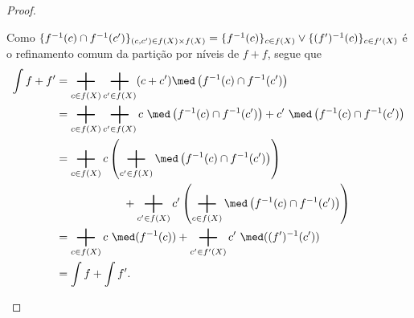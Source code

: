 \begin{proof}
\begin{enumerate}
\begin{equation*}
	\end{equation*}
Como $\{f^{-1}(c) \cap f^{-1}(c')\}_{(c,c') \in f(X) \times f(X)} = \{f^{-1}(c)\}_{c \in f(X)} \vee \{(f')^{-1}(c)\}_{c \in f'(X)}$ é o refinamento comum da partição por níveis de $f + f$, segue que
	\begin{align*}
	\int f+f' &= \sum_{c \in f(X)} \sum_{c' \in f(X)} (c + c') \med\left(f\inv(c) \cap f\inv(c')\right) \\
		&= \sum_{c \in f(X)} \sum_{c' \in f(X)} c \ \med\left(f\inv(c) \cap f\inv(c')\right) + c' \ \med\left(f\inv(c) \cap f\inv(c')\right) \\
		&= \sum_{c \in f(X)} c \left(\sum_{c' \in f(X)} \med\left(f\inv(c) \cap f\inv(c')\right)\right) \\
		&\qquad\qquad\qquad + \sum_{c' \in f(X)} c' \left(\sum_{c \in f(X)} \med\left(f\inv(c) \cap f\inv(c')\right)\right) \\
		&= \sum_{c \in f(X)} c \ \med(f\inv(c)) + \sum_{c' \in f'(X)} c' \ \med((f')\inv(c')) \\
		&= \int f + \int f'.
	\end{align*}

\end{enumerate}
\end{proof}

